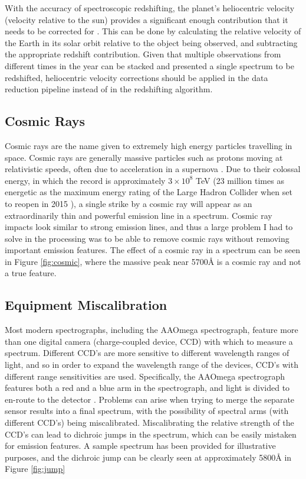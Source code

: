 \documentclass[titlesmallcaps, examinerscopy, copyrightpage]{uqthesis}
\begin{document}
With the accuracy of spectroscopic redshifting, the planet's heliocentric velocity (velocity relative to the sun) provides a significant enough contribution that it needs to be corrected for \cite{colless20012df,baldry2014galaxy}. This can be done by calculating the relative velocity of the Earth in its solar orbit relative to the object being observed, and subtracting the appropriate redshift contribution. Given that multiple observations from different times in the year can be stacked and presented a single spectrum to be redshifted, heliocentric velocity corrections should be applied in the data reduction pipeline instead of in the redshifting algorithm.

\subsection{Cosmic Rays}

Cosmic rays are the name given to extremely high energy particles travelling in space. Cosmic rays are generally massive particles such as protons moving at relativistic speeds, often due to acceleration in a supernova \cite{ackermann2013detection}. Due to their colossal energy, in which the record is approximately $3\times10^{8}$ TeV (23 million times as energetic as the maximum energy rating of the Large Hadron Collider when set to reopen in 2015 \cite{lhc}), a single strike by a cosmic ray will appear as an extraordinarily thin and powerful emission line in a spectrum. Cosmic ray impacts look similar to strong emission lines, and thus a large problem I had to solve in the processing was to be able to remove cosmic rays without removing important emission features. The effect of a cosmic ray in a spectrum can be seen in Figure \ref{fig:cosmic}, where the massive peak near 5700{\AA} is a cosmic ray and not a true feature.


\subsection{Equipment Miscalibration}

Most modern spectrographs, including the AAOmega spectrograph, feature more than one digital camera (charge-coupled device, CCD) with which to measure a spectrum. Different CCD's are more sensitive to different wavelength ranges of light, and so in order to expand the wavelength range of the devices, CCD's with different range sensitivities are used.  Specifically, the AAOmega spectrograph features both a red and a blue arm in the spectrograph, and light is divided to en-route to the detector \cite{aaomega}. Problems can arise when trying to merge the separate sensor results into a final spectrum, with the possibility of spectral arms (with different CCD's) being miscalibrated. Miscalibrating the relative strength of the CCD's can lead to dichroic jumps in the spectrum, which can be easily mistaken for emission features. A sample spectrum has been provided for illustrative purposes, and the dichroic jump can be clearly seen at approximately 5800{\AA} in Figure \ref{fig:jump}
\end{document}
